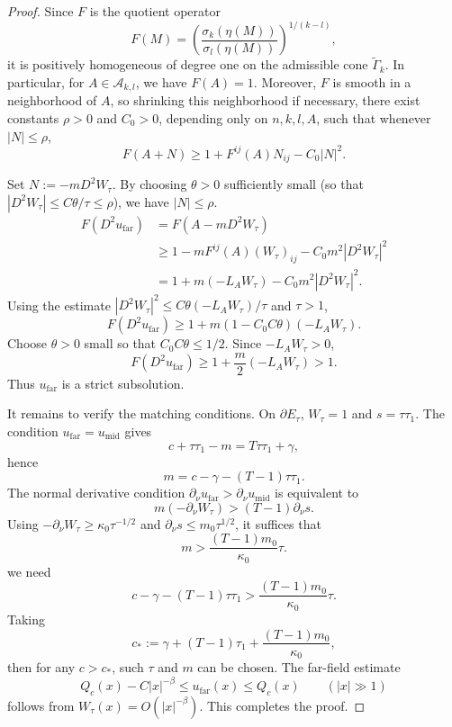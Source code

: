 \documentclass[reqno,a4paper]{amsart}
\numberwithin{equation}{section}
\begin{document}
	\begin{proof}
		Since $F$ is the quotient operator
		\[
		F(M)=\left(\frac{\sigma_k(\eta(M))}{\sigma_l(\eta(M))}\right)^{1/(k-l)},
		\]
		it is positively homogeneous of degree one on the admissible cone $\widetilde{\Gamma}_k$. In particular, for $A\in\mathcal{A}_{k,l}$, we have $F(A)=1$. Moreover, $F$ is smooth in a neighborhood of $A$, so shrinking this neighborhood if necessary, there exist constants $\rho>0$ and $C_0>0$, depending only on $n,k,l,A$, such that whenever $|N|\le\rho$,
		\begin{equation}
			F(A+N)\ge 1+F^{ij}(A)N_{ij}-C_0|N|^2.
		\end{equation}
		
		Set $N:=-mD^2W_\tau$. By choosing $\theta>0$ sufficiently small (so that $|D^2W_\tau|\le C\theta/\tau\le \rho$), we have $|N|\le\rho$. 
		\[
		\begin{aligned}
			F(D^2u_{\mathrm{far}})
			&=F(A-mD^2W_\tau)\\
			&\ge 1 - mF^{ij}(A)(W_\tau)_{ij}-C_0m^2|D^2W_\tau|^2\\
			&=1+m(-L_AW_\tau)-C_0m^2|D^2W_\tau|^2.
		\end{aligned}
		\]
		Using the estimate $|D^2W_\tau|^2\le C\theta(-L_AW_\tau)/\tau$ and $\tau>1$,
		\begin{equation}
			F(D^2u_{\mathrm{far}})
			\ge 1+m(1-C_0C\theta)(-L_AW_\tau).
		\end{equation}
		Choose $\theta>0$ small so that $C_0C\theta\le 1/2$. Since $-L_AW_\tau>0$,
		\begin{equation}
			F(D^2u_{\mathrm{far}})\ge 1+\frac{m}{2}(-L_AW_\tau)>1.
		\end{equation}
		Thus $u_{\mathrm{far}}$ is a strict subsolution.
		
		It remains to verify the matching conditions. On $\partial E_\tau$, $W_\tau=1$ and $s=\tau\tau_1$. The condition $u_{\mathrm{far}}=u_{\mathrm{mid}}$ gives
		\begin{equation}
			c+\tau\tau_1-m=T\tau\tau_1+\gamma,
		\end{equation}
		hence
		\begin{equation}
			m=c-\gamma-(T-1)\tau\tau_1. 
		\end{equation}
		The normal derivative condition $\partial_\nu u_{\mathrm{far}}>\partial_\nu u_{\mathrm{mid}}$ is equivalent to
		\[
		m(-\partial_\nu W_\tau)>(T-1)\partial_\nu s.
		\]
		Using $-\partial_\nu W_\tau\ge \kappa_0\tau^{-1/2}$ and $\partial_\nu s\le m_0\tau^{1/2}$, it suffices that
		\[
		m>\frac{(T-1)m_0}{\kappa_0}\tau. 
		\]
		we need
		\begin{equation}
			c-\gamma-(T-1)\tau\tau_1>\frac{(T-1)m_0}{\kappa_0}\tau.
		\end{equation}
		Taking
		\begin{equation}
			c_*:=\gamma+(T-1)\tau_1+\frac{(T-1)m_0}{\kappa_0},
		\end{equation}
		then for any $c>c_*$, such $\tau$ and $m$ can be chosen. The far-field estimate
		\[
		Q_c(x)-C|x|^{-\beta}\le u_{\mathrm{far}}(x)\le Q_c(x)\qquad (|x|\gg1)
		\]
		follows from $W_\tau(x)=O(|x|^{-\beta})$. This completes the proof.
	\end{proof}
	
\end{document}

